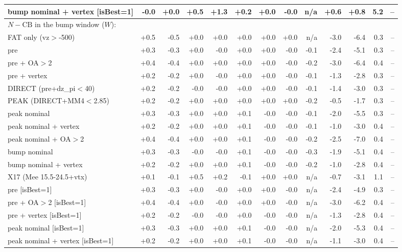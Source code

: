 \begin{table}[p]
{\begin{tabular}{lrrrrrrrrrrrr}
bump nominal + vertex [isBest=1] & -0.0 & +0.0 & +0.5 & +1.3 & +0.2 & +0.0 & -0.0 & n/a & +0.6 & +0.8 & 5.2 & --\\
\midrule
\multicolumn{13}{l}{$N-\text{CB}$ in the bump window ($W$):}\\
FAT only (vz$>$-500) & +0.5 & -0.5 & +0.0 & +0.0 & +0.0 & +0.0 & +0.0 & n/a & -3.0 & -6.4 & 0.3 & --\\
pre & +0.3 & -0.3 & +0.0 & -0.0 & +0.0 & +0.0 & -0.0 & -0.1 & -2.4 & -5.1 & 0.3 & --\\
pre + OA$>$2 & +0.4 & -0.4 & +0.0 & +0.0 & +0.0 & +0.0 & -0.0 & -0.2 & -3.0 & -6.4 & 0.4 & --\\
pre + vertex & +0.2 & -0.2 & +0.0 & -0.0 & +0.0 & +0.0 & -0.0 & -0.1 & -1.3 & -2.8 & 0.3 & --\\
DIRECT (pre+dz\_pi$<$40) & +0.2 & -0.2 & -0.0 & -0.0 & +0.0 & +0.0 & -0.0 & -0.1 & -1.4 & -3.0 & 0.3 & --\\
PEAK (DIRECT+MM4$<$2.85) & +0.2 & -0.2 & +0.0 & +0.0 & +0.0 & +0.0 & +0.0 & -0.2 & -0.5 & -1.7 & 0.3 & --\\
peak nominal & +0.3 & -0.3 & +0.0 & +0.0 & +0.1 & -0.0 & -0.0 & -0.1 & -2.0 & -5.5 & 0.3 & --\\
peak nominal + vertex & +0.2 & -0.2 & +0.0 & +0.0 & +0.1 & -0.0 & -0.0 & -0.1 & -1.0 & -3.0 & 0.4 & --\\
peak nominal + OA$>$2 & +0.4 & -0.4 & +0.0 & +0.0 & +0.1 & -0.0 & -0.0 & -0.2 & -2.5 & -7.0 & 0.4 & --\\
bump nominal & +0.3 & -0.3 & -0.0 & -0.0 & +0.1 & -0.0 & -0.0 & -0.3 & -1.9 & -5.1 & 0.4 & --\\
bump nominal + vertex & +0.2 & -0.2 & +0.0 & +0.0 & +0.1 & -0.0 & -0.0 & -0.2 & -1.0 & -2.8 & 0.4 & --\\
X17 (Mee 15.5-24.5+vtx) & +0.1 & -0.1 & +0.5 & +0.2 & -0.1 & +0.0 & +0.0 & n/a & -0.7 & -3.1 & 1.1 & --\\
pre [isBest=1] & +0.3 & -0.3 & +0.0 & -0.0 & +0.0 & +0.0 & -0.0 & n/a & -2.4 & -4.9 & 0.3 & --\\
pre + OA$>$2 [isBest=1] & +0.4 & -0.4 & +0.0 & -0.0 & +0.0 & +0.0 & -0.0 & n/a & -3.0 & -6.2 & 0.4 & --\\
pre + vertex [isBest=1] & +0.2 & -0.2 & -0.0 & -0.0 & +0.0 & -0.0 & -0.0 & n/a & -1.3 & -2.8 & 0.4 & --\\
peak nominal [isBest=1] & +0.3 & -0.3 & +0.0 & +0.0 & +0.1 & -0.0 & -0.0 & n/a & -2.0 & -5.3 & 0.4 & --\\
peak nominal + vertex [isBest=1] & +0.2 & -0.2 & +0.0 & +0.0 & +0.1 & -0.0 & -0.0 & n/a & -1.1 & -3.0 & 0.4 & --\\
\bottomrule
\end{tabular}}
\end{table}
